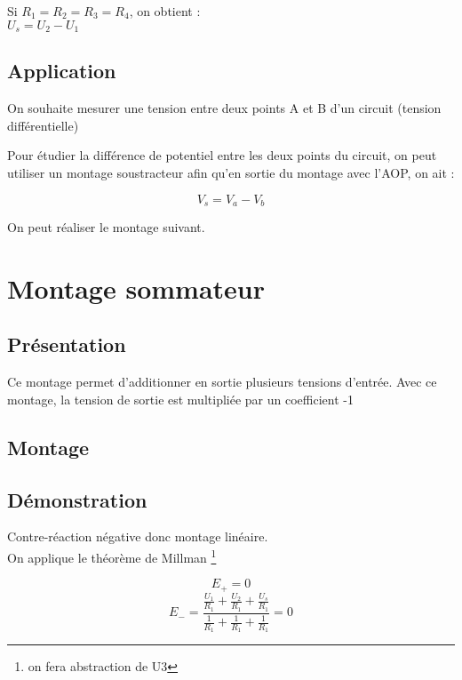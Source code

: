 Si $R_1=R_2=R_3=R_4$, on obtient : \\

$U_s=U_2-U_1$\\

\section{Application}

\begin{exemple}
On souhaite mesurer une tension entre deux points A et B d’un circuit (tension différentielle)
\end{exemple}


Pour étudier la différence de potentiel entre les deux points du circuit, on peut utiliser un montage soustracteur 
afin qu’en sortie du montage avec l’AOP, on ait : 

$$ V_s=V_a-V_b$$

On peut réaliser le montage suivant.

\chapter{Montage sommateur}

\section{Présentation}
Ce montage permet d'additionner en sortie plusieurs tensions d’entrée. Avec ce montage, la tension de sortie est multipliée par un coefficient -1

\section{Montage}

\section{Démonstration}

Contre-réaction négative donc montage linéaire. \\
On applique le théorème de Millman \footnote{on fera abstraction de U3}

$$E_+=0$$
$$ E_- = \frac{ \frac{U_1}{R_1} + \frac{U_2}{R_1} + \frac{U_s}{R_1} }{\frac{1}{R_1} + \frac{1}{R_1} + \frac{1}{R_1}}=0$$

